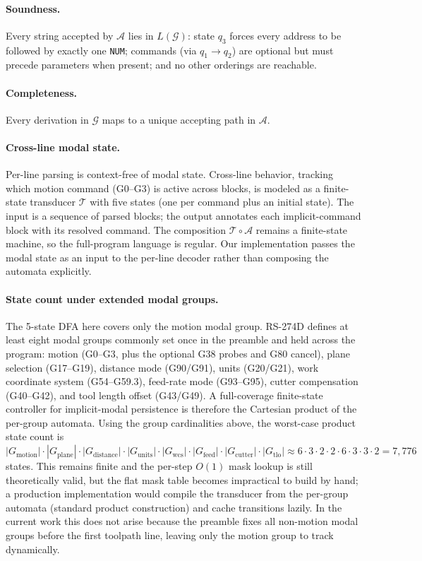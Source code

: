 \documentclass[sensors,article,submit,moreauthors,pdftex]{Definitions/mdpi}
\begin{document}
\paragraph{Soundness.} Every string accepted by $\mathcal{A}$ lies in $L(\mathcal{G})$: state $q_3$ forces every address to be followed by exactly one \texttt{NUM}; commands (via $q_1 \to q_2$) are optional but must precede parameters when present; and no other orderings are reachable.

\paragraph{Completeness.} Every derivation in $\mathcal{G}$ maps to a unique accepting path in $\mathcal{A}$.

\paragraph{Cross-line modal state.} Per-line parsing is context-free of modal state. Cross-line behavior, tracking which motion command (G0--G3) is active across blocks, is modeled as a finite-state transducer $\mathcal{T}$ with five states (one per command plus an initial state). The input is a sequence of parsed blocks; the output annotates each implicit-command block with its resolved command. The composition $\mathcal{T} \circ \mathcal{A}$ remains a finite-state machine, so the full-program language is regular. Our implementation passes the modal state as an input to the per-line decoder rather than composing the automata explicitly.

\paragraph{State count under extended modal groups.}
The 5-state DFA here covers only the motion modal group. RS-274D defines at least eight modal groups commonly set once in the preamble and held across the program: motion (G0--G3, plus the optional G38 probes and G80 cancel), plane selection (G17--G19), distance mode (G90/G91), units (G20/G21), work coordinate system (G54--G59.3), feed-rate mode (G93--G95), cutter compensation (G40--G42), and tool length offset (G43/G49). A full-coverage finite-state controller for implicit-modal persistence is therefore the Cartesian product of the per-group automata. Using the group cardinalities above, the worst-case product state count is $|G_{\text{motion}}| \cdot |G_{\text{plane}}| \cdot |G_{\text{distance}}| \cdot |G_{\text{units}}| \cdot |G_{\text{wcs}}| \cdot |G_{\text{feed}}| \cdot |G_{\text{cutter}}| \cdot |G_{\text{tlo}}| \approx 6 \cdot 3 \cdot 2 \cdot 2 \cdot 6 \cdot 3 \cdot 3 \cdot 2 = 7{,}776$ states. This remains finite and the per-step $O(1)$ mask lookup is still theoretically valid, but the flat mask table becomes impractical to build by hand; a production implementation would compile the transducer from the per-group automata (standard product construction) and cache transitions lazily. In the current work this does not arise because the preamble fixes all non-motion modal groups before the first toolpath line, leaving only the motion group to track dynamically.
\end{document}
